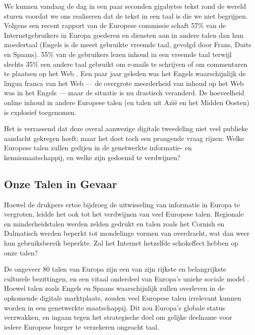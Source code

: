 \documentclass[]{../../metanetpaper}
\begin{document}
\begin{multicols}{2}
    We kunnen vandaag de dag in een paar seconden gigabytes tekst rond de wereld sturen voordat we ons realiseren dat de tekst in een taal is die we niet begrijpen. Volgens een recent rapport van de Europese commissie schaft 57\% van de Internetgebruikers in Europa goederen en diensten aan in andere talen dan hun moedertaal (Engels is de meest gebruikte vreemde taal, gevolgd door Frans, Duits en Spaans). 55\% van de gebruikers lezen inhoud in een vreemde taal terwijl slechts 35\% een andere taal gebruikt om e-mails te schrijven of om commentaren te plaatsen op het Web \cite{EC1}.   Een paar jaar geleden was het Engels waarschijnlijk de lingua franca van het Web --- de overgrote meerderheid van inhoud op het Web was in het Engels --- maar de situatie is nu drastisch veranderd. De hoeveelheid online inhoud in andere Europese talen (en talen uit Azi{\"e} en het Midden Oosten) is explosief toegenomen.

Het is verrassend dat deze overal aanwezige digitale tweedeling niet veel publieke aandacht gekregen heeft; maar het doet toch een prangende vraag rijzen: Welke Europese talen zullen gedijen in de genetwerkte informatie- en kennismaatschappij, en welke zijn gedoemd te verdwijnen?

\subsection{Onze Talen in Gevaar}

    Hoewel de drukpers ertoe bijdroeg de uitwisseling van informatie in Europa te vergroten, leidde het ook tot het verdwijnen van veel Europese talen. Regionale en minderheidstalen werden zelden gedrukt en talen zoals het Cornish en Dalmatisch werden beperkt tot mondelinge vormen van overdracht, wat dan weer hun gebruiksbereik beperkte. Zal het Internet hetzelfde schokeffect hebben op onze talen?


    De ongeveer 80 talen van Europa zijn een van zijn rijkste en belangrijkste culturele bezittingen, en een vitaal onderdeel van Europa's unieke sociale model \cite{EC2}.  Hoewel talen zoals Engels en Spaans waarschijnlijk zullen overleven in de opkomende digitale marktplaats, zouden veel Europese talen irrelevant kunnen worden in een genetwerkte maatschappij. Dit zou Europa's globale status verzwakken, en ingaan tegen het strategische doel om gelijke deelname voor iedere Europese burger te verzekeren ongeacht taal.


\end{multicols}
\end{document}
